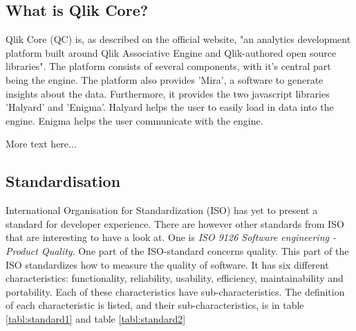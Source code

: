 \documentclass{article}
\begin{document}
\subsection{What is Qlik Core?}
Qlik Core (QC) is, as described on the official website, "an analytics
development platform built around Qlik Associative Engine and
Qlik-authored open source libraries".\cite{qlikwebsite} The
platform consists of several components, with it's central part being
the engine. The platform also provides 'Mira', a software to generate
insights about the data. Furthermore, it provides the two javascript
libraries 'Halyard' and 'Enigma'. Halyard helps the user to easily load
in data into the engine. Enigma helps the user communicate with the
engine.

More text here...


\subsection{Standardisation}
International Organisation for Standardization (ISO) has yet to present a
standard for developer experience. There are however other standards from ISO
that are interesting to have a look at. One is \textit{ISO 9126 Software engineering - Product Quality}.
One part of the ISO-standard concerns quality. This part of the ISO standardizes how to measure the quality of software.
It has six different characteristics: functionality, reliability, usability, efficiency, maintainability and
portability. Each of these characteristics have sub-characteristics. The definition of each
characteristic is listed, and their sub-characteristics, is in table \ref{tabl:standard1} and table \ref{tabl:standard2}
\end{document}

